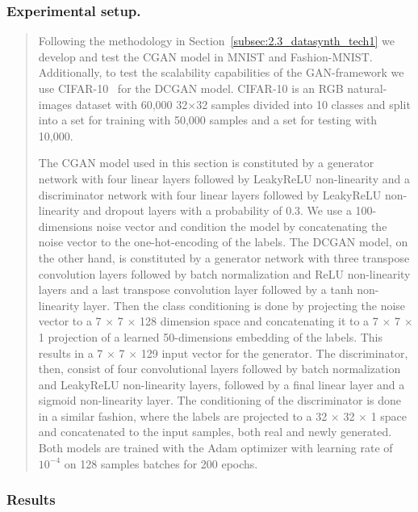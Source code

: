 \subsubsection*{Experimental setup.} 
\begin{quote}
Following the methodology in Section~\ref{subsec:2.3_datasynth_tech1} we develop and test the CGAN model in MNIST and Fashion-MNIST. Additionally, to test the scalability capabilities of the GAN-framework we use CIFAR-10~\cite{2009_CIFAR} for the DCGAN model. CIFAR-10 is an RGB natural-images dataset with 60,000 32$\times$32 samples divided into 10 classes and split into a set for training with 50,000 samples and a set for testing with 10,000.

The CGAN model used in this section is constituted by a generator network with four linear layers followed by LeakyReLU non-linearity and a discriminator network with four linear layers followed by LeakyReLU non-linearity and dropout layers with a probability of 0.3. We use a 100-dimensions noise vector and condition the model by concatenating the noise vector to the one-hot-encoding of the labels. The DCGAN model, on the other hand, is constituted by a generator network with three transpose convolution layers followed by batch normalization and ReLU non-linearity layers and a last transpose convolution layer followed by a tanh non-linearity layer. Then the class conditioning is done by projecting the noise vector to a 7 $\times$ 7 $\times$ 128 dimension space and concatenating it to a 7 $\times$ 7 $\times$ 1 projection of a learned 50-dimensions embedding of the labels. This results in a 7 $\times$ 7 $\times$ 129 input vector for the generator. The discriminator, then, consist of four convolutional layers followed by batch normalization and LeakyReLU non-linearity layers, followed by a final linear layer and a sigmoid non-linearity layer. The conditioning of the discriminator is done in a similar fashion, where the labels are projected to a 32 $\times$ 32 $\times$ 1 space and concatenated to the input samples, both real and newly generated. Both models are trained with the Adam optimizer with learning rate of $10^{-4}$ on 128 samples batches for 200 epochs.
\end{quote}

\subsubsection{Results}

